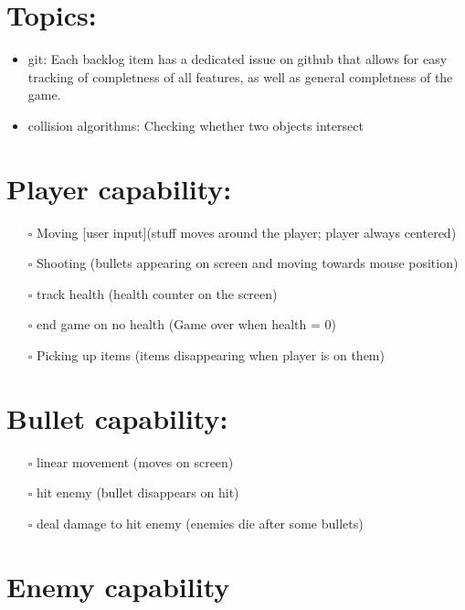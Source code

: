 \documentclass[
]{article}
\author{}
\date{}
\providecommand{\tightlist}{%
  \setlength{\itemsep}{0pt}\setlength{\parskip}{0pt}}
\begin{document}
\section{Topics:}\label{topics}

\begin{itemize}
\tightlist
\item
  git: 
    Each backlog item has a dedicated issue on github that allows for easy tracking of completness of all features, as well as general completness of the game.
\item
  collision algorithms: Checking whether two objects intersect 
\end{itemize}

\section{Player capability:}\label{player-capability}

\begin{itemize}
\tightlist
\item[$\square$]
  Moving {[}user input{]}(stuff moves around the player; player always
  centered)
\item[$\square$]
  Shooting (bullets appearing on screen and moving towards mouse
  position)
\item[$\square$]
  track health (health counter on the screen)
\item[$\square$]
  end game on no health (Game over when health = 0)
\item[$\square$]
  Picking up items (items disappearing when player is on them)
\end{itemize}

\section{Bullet capability:}\label{bullet-capability}

\begin{itemize}
\tightlist
\item[$\square$]
  linear movement (moves on screen)
\item[$\square$]
  hit enemy (bullet disappears on hit)
\item[$\square$]
  deal damage to hit enemy (enemies die after some bullets)
\end{itemize}

\section{Enemy capability}\label{enemy-capability}
\end{document}
